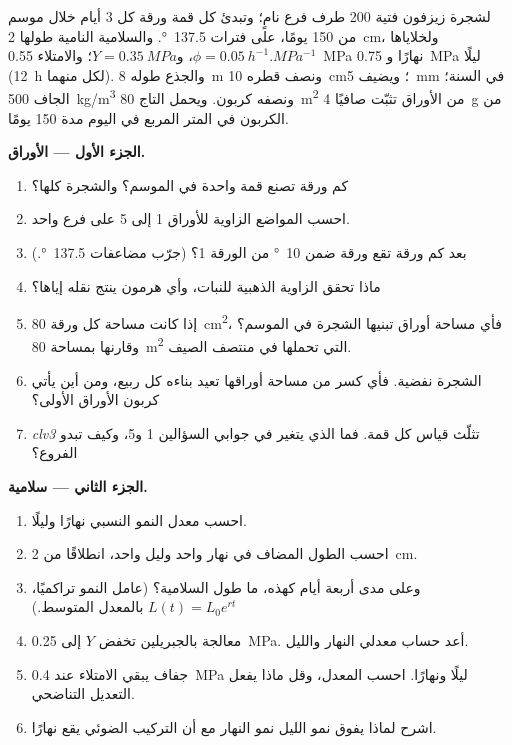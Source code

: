 \begin{problem}
\label{pb:b2:plant-meristems:1}
لشجرة زيزفون فتية \num{200} طرف فرع نامٍ؛ وتبدئ كل قمة
ورقة كل \num{3} أيام خلال موسم من \num{150} يومًا، على
فترات \qty{137.5}{\degree}. والسلامية النامية طولها \qty{2}{cm}،
ولخلاياها $\phi = \qty{0.05}{h^{-1}.MPa^{-1}}$، و$Y =
\qty{0.35}{MPa}$؛ والامتلاء \qty{0.55}{MPa} نهارًا و
\qty{0.75}{MPa} ليلًا (\qty{12}{h} لكل منهما). والجذع
طوله \qty{8}{m} ونصف قطره \qty{10}{cm}؛ ويضيف 
\qty{5}{mm} في السنة؛  الجاف \qty{500}{kg/m^3} ونصفه كربون.
ويحمل التاج \qty{80}{m^2} من الأوراق تثبّت صافيًا \qty{4}{g} من
الكربون في المتر المربع في اليوم مدة \num{150} يومًا.

\medskip
\noindent\textbf{الجزء الأول --- الأوراق.}
\begin{enumerate}
  \item كم ورقة تصنع قمة واحدة في الموسم؟ والشجرة
        كلها؟
  \item احسب المواضع الزاوية للأوراق 1 إلى 5 على فرع واحد.
  \item بعد كم ورقة تقع ورقة ضمن
        \qty{10}{\degree} من الورقة 1؟ (جرّب مضاعفات
        \qty{137.5}{\degree}.)
  \item ماذا تحقق الزاوية الذهبية للنبات، وأي هرمون
        ينتج نقله إياها؟
  \item إذا كانت مساحة كل ورقة \qty{80}{cm^2}، فأي مساحة أوراق
        تبنيها الشجرة في الموسم؟ وقارنها بمساحة \qty{80}{m^2}
        التي تحملها في منتصف الصيف.
  \item الشجرة نفضية. فأي كسر من مساحة أوراقها تعيد بناءه
        كل ربيع، ومن أين يأتي كربون الأوراق الأولى؟
  \item {} \emph{clv3} تثلّث قياس كل قمة. فما الذي
        يتغير في جوابي السؤالين 1 و5، وكيف تبدو
        الفروع؟
\end{enumerate}

\medskip
\noindent\textbf{الجزء الثاني --- سلامية.}
\begin{enumerate}[resume]
  \item احسب معدل النمو النسبي نهارًا وليلًا.
  \item احسب الطول المضاف في نهار واحد وليل واحد، انطلاقًا
        من \qty{2}{cm}.
  \item وعلى مدى أربعة أيام كهذه، ما طول السلامية؟
        (عامل النمو تراكميًا، $L(t) = L_0 e^{rt}$ بالمعدل
        المتوسط.)
  \item معالجة بالجبريلين تخفض $Y$ إلى \qty{0.25}{MPa}.
        أعد حساب معدلي النهار والليل.
  \item جفاف يبقي الامتلاء عند \qty{0.4}{MPa} ليلًا ونهارًا.
        احسب المعدل، وقل ماذا يفعل التعديل التناضحي.
  \item اشرح لماذا يفوق نمو الليل نمو النهار مع أن
        التركيب الضوئي يقع نهارًا.
\end{enumerate}


\end{problem}
